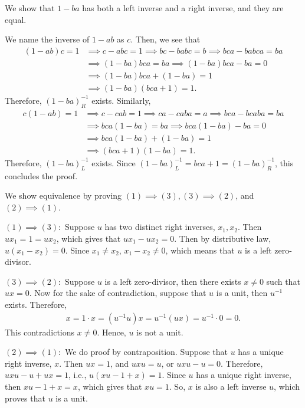 \documentclass[12pt]{article}
\begin{document}
\begin{fproof}[Jacobson 2.2.4]
  We show that \(1-ba\) has both a left inverse and a right inverse, and they are equal.

  We name the inverse of \(1-ab\) as \(c\). Then, we see that
  \begin{align*}
    (1-ab)c = 1 & \implies c - abc = 1 \implies bc - babc = b \implies bca - babca = ba \\
    & \implies (1-ba)bca = ba \implies (1-ba)bca - ba = 0\\
    & \implies (1-ba)bca + (1-ba) = 1\\
    & \implies (1-ba)(bca + 1) = 1.
  \end{align*}
  Therefore, \((1-ba)^{-1}_R\) exists.
  Similarly,
  \begin{align*}
    c(1-ab) = 1 & \implies c - cab = 1 \implies ca - caba = a \implies bca - bcaba = ba\\
    & \implies bca(1-ba) = ba \implies bca(1-ba) - ba = 0\\
    & \implies bca(1-ba) + (1-ba) = 1\\
    & \implies (bca + 1)(1-ba) = 1.
  \end{align*}
  Therefore, \((1-ba)^{-1}_L\) exists.
  Since \((1-ba)^{-1}_L = bca+1 = (1-ba)^{-1}_R\), this concludes the proof.
\end{fproof}
\newpage

\begin{fproof}[Jacobson 2.2.6]
  We show equivalence by proving \((1) \implies (3), (3) \implies (2)\), and \((2) \implies (1)\).

  \((1) \implies (3):\)
  Suppose \(u\) has two distinct right inverses, \(x_1, x_2\).
  Then \(ux_1 = 1 = ux_2\), which gives that \(ux_1 - ux_2 = 0\).
  Then by distributive law, \(u(x_1-x_2) = 0\).
  Since \(x_1 \neq x_2\), \(x_1 - x_2 \neq 0\), which means that \(u\) is a left zero-divisor.

  \((3) \implies (2):\)
  Suppose \(u\) is a left zero-divisor, then there exists \(x \neq 0\) such that \(ux = 0\).
  Now for the sake of contradiction, suppose that \(u\) is a unit, then \(u^{-1}\) exists. 
  Therefore,
  \begin{align*}
    x = 1 \cdot x = (u^{-1}u)x = u^{-1}(ux) = u^{-1} \cdot 0 = 0.
  \end{align*}
  This contradictions \(x \neq 0\). Hence, \(u\) is not a unit.

  \((2) \implies (1):\)
  We do proof by contraposition.
  Suppose that \(u\) has a unique right inverse, \(x\).
  Then \(ux = 1\), and \(uxu = u\), or \(uxu-u=0\).
  Therefore, \(uxu - u+ux = 1\), i.e., \(u(xu-1+x) = 1\).
  Since \(u\) has a unique right inverse, then \(xu - 1 + x = x\), which gives that \(xu = 1\).
  So, \(x\) is also a left inverse \(u\), which proves that \(u\) is a unit.

\end{fproof}
\newpage
\end{document}
